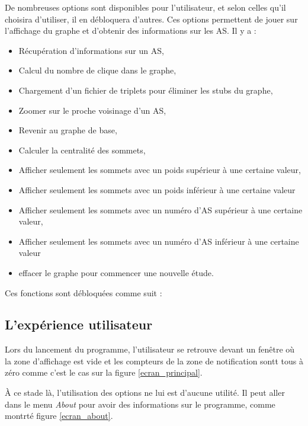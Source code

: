 \par
De nombreuses options sont disponibles pour l'utilisateur, et selon celles qu'il choisira d'utiliser, il en d\'ebloquera d'autres. Ces options permettent de jouer sur l'affichage du graphe et d'obtenir des informations sur les AS. Il y a :
\begin{itemize}
 \item R\'ecup\'eration d'informations sur un AS,
 \item Calcul du nombre de clique dans le graphe,
 \item Chargement d'un fichier de triplets pour \'eliminer les stubs du graphe,
 \item Zoomer sur le proche voisinage d'un AS,
 \item Revenir au graphe de base,
 \item Calculer la centralit\'e des sommets,
 \item Afficher seulement les sommets avec un poids sup\'erieur \`a une certaine valeur,
 \item Afficher seulement les sommets avec un poids inf\'erieur \`a une certaine valeur
 \item Afficher seulement les sommets avec un num\'ero d'AS sup\'erieur \`a une certaine valeur,
 \item Afficher seulement les sommets avec un num\'ero d'AS inf\'erieur \`a une certaine valeur
 \item effacer le graphe pour commencer une nouvelle \'etude.
\end{itemize}

Ces fonctions sont d\'ebloqu\'ees comme suit :



\subsection{L'exp\'erience utilisateur}
\par
Lors du lancement du programme, l'utilisateur se retrouve devant un fen\^etre o\`u la zone d'affichage est vide et les compteurs de la zone de notification sontt tous \`a z\'ero comme c'est le cas sur la figure \ref{ecran_principal}.
\par
\`A ce stade l\`a, l'utilisation des options ne lui est d'aucune utilit\'e. Il peut aller dans le menu \textit{About} pour avoir des informations sur le programme, comme montrt\'e figure \ref{ecran_about}.

